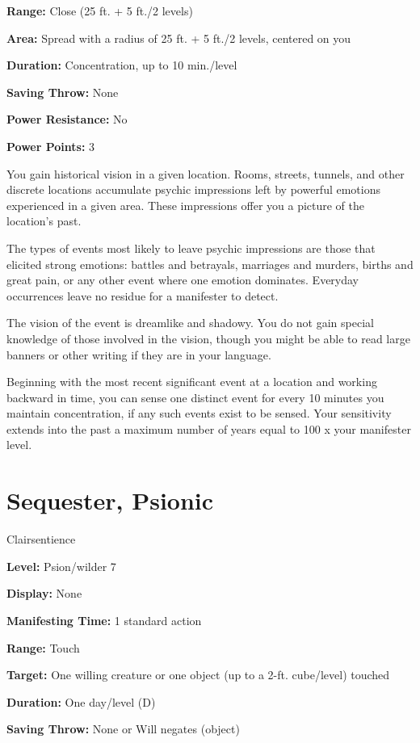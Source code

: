 \documentclass{article}
\begin{document}
\textbf{Range:} Close (25 ft. + 5 ft./2 levels)

\textbf{Area:} Spread with a radius of 25 ft. + 5 ft./2 levels, centered on you

\textbf{Duration:} Concentration, up to 10 min./level

\textbf{Saving Throw:} None

\textbf{Power Resistance:} No

\textbf{Power Points:} 3

You gain historical vision in a given location. Rooms, streets, tunnels, and other 
discrete locations accumulate psychic impressions left by powerful emotions experienced 
in a given area. These impressions offer you a picture of the location's past.

The types of events most likely to leave psychic impressions are those that elicited 
strong emotions: battles and betrayals, marriages and murders, births and great 
pain, or any other event where one emotion dominates. Everyday occurrences leave 
no residue for a manifester to detect.

The vision of the event is dreamlike and shadowy. You do not gain special knowledge 
of those involved in the vision, though you might be able to read large banners 
or other writing if they are in your language.

Beginning with the most recent significant event at a location and working backward 
in time, you can sense one distinct event for every 10 minutes you maintain concentration, 
if any such events exist to be sensed. Your sensitivity extends into the past a 
maximum number of years equal to 100 x your manifester level.

\vspace{12pt}
\section*{Sequester, Psionic}

Clairsentience

\textbf{Level:} Psion/wilder 7

\textbf{Display:} None

\textbf{Manifesting Time:} 1 standard action

\textbf{Range:} Touch

\textbf{Target:} One willing creature or one object (up to a 2-ft. cube/level) 
touched

\textbf{Duration:} One day/level (D)

\textbf{Saving Throw:} None or Will negates (object)
\end{document}

